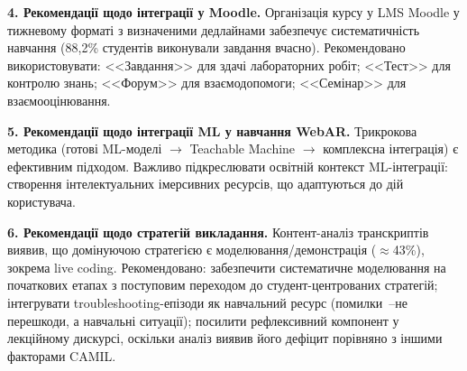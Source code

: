 \textbf{4. Рекомендації щодо інтеграції у Moodle.} Організація курсу у LMS Moodle у тижневому форматі з визначеними дедлайнами забезпечує систематичність навчання (88,2\% студентів виконували завдання вчасно). Рекомендовано використовувати: <<Завдання>> для здачі лабораторних робіт; <<Тест>> для контролю знань; <<Форум>> для взаємодопомоги; <<Семінар>> для взаємооцінювання.

\textbf{5. Рекомендації щодо інтеграції ML у навчання WebAR.} Трикрокова методика (готові ML-моделі $\to$ Teachable Machine $\to$ комплексна інтеграція) є ефективним підходом. Важливо підкреслювати освітній контекст ML-інтеграції: створення інтелектуальних імерсивних ресурсів, що адаптуються до дій користувача.

\textbf{6. Рекомендації щодо стратегій викладання.} Контент-аналіз транскриптів виявив, що домінуючою стратегією є моделювання/демонстрація ($\approx$43\%), зокрема live coding. Рекомендовано: забезпечити систематичне моделювання на початкових етапах з поступовим переходом до студент-центрованих стратегій; інтегрувати troubleshooting-епізоди як навчальний ресурс (помилки~--не перешкоди, а навчальні ситуації); посилити рефлексивний компонент у лекційному дискурсі, оскільки аналіз виявив його дефіцит порівняно з іншими факторами CAMIL.

